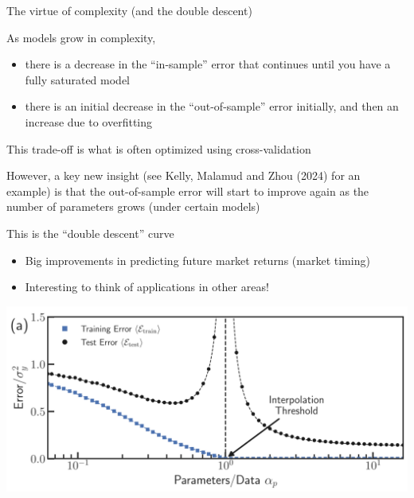 \documentclass[notes,11pt, aspectratio=169]{beamer}
\newenvironment{wideitemize}{\itemize\addtolength{\itemsep}{10pt}}{\enditemize}
\begin{document}
\begin{frame}{The virtue of complexity (and the double descent)}
  \begin{wideitemize}
  \item As models grow in complexity, 
  \begin{itemize}
    \item there is a decrease in the ``in-sample'' error that continues until you have a fully saturated model
    \item there is an initial decrease in the ``out-of-sample'' error initially, and then an increase due to overfitting
  \end{itemize}
  \item This trade-off is what is often optimized using cross-validation
  \item However, a key new insight (see Kelly, Malamud and Zhou (2024) for an example) is that the out-of-sample error will start to improve again as the number of parameters grows (under certain models)
  \item This is the ``double descent'' curve
  \begin{itemize}
    \item Big improvements in predicting future market returns (market timing)
    \item Interesting to think of applications in other areas!
  \end{itemize}
  \end{wideitemize}
\end{frame}

\begin{frame}
  \includegraphics[width=\linewidth]{images/double_descent.png}
\end{frame}
\end{document}
